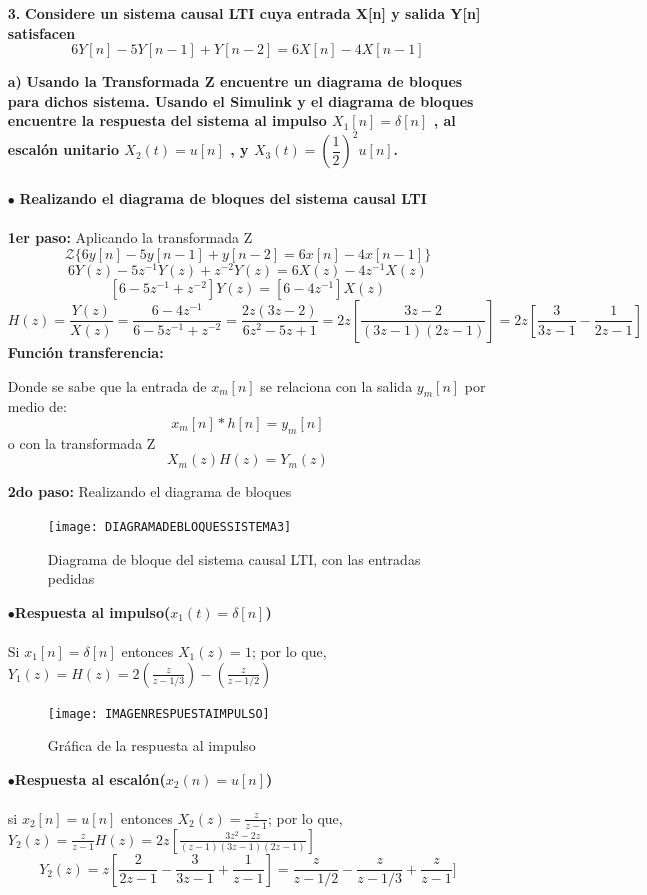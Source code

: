 \documentclass[11pt,a4paper]{article}
\begin{document}
{{\begin{enumerate}
	\item[\textbf{3.}]\textbf{Considere un sistema causal LTI cuya entrada X[n] y salida Y[n] satisfacen $$6Y[n]-5Y[n-1]+Y[n-2]=6X[n]-4X[n-1]$$}
	\item[\textbf{a)}]
	\textbf{Usando la Transformada Z encuentre un diagrama de bloques para dichos sistema. Usando el Simulink y el diagrama de bloques encuentre la respuesta del sistema al impulso $X_{1}[n]=\delta[n]$ , al escalón unitario $X_{2}(t)=u[n]$ , y $X_{3}(t)=(\dfrac{1}{2})^2 u[n]$.}\\\\
    $\bullet$ \textbf{Realizando el diagrama de bloques del sistema causal LTI}\\\\
    \textbf{1er paso:} Aplicando la transformada Z 
    $$\mathcal{Z}\{6y[n]-5y[n-1]+y[n-2]=6x[n]-4x[n-1]\}$$   
    $$6Y(z)-5z^{-1}Y(z)+z^{-2}Y(z)=6X(z)-4z^{-1}X(z)$$  
    $$[6-5z^{-1}+z^{-2}]Y(z)=[6-4z^{-1}]X(z)$$   
    $$H(z)=\frac{Y(z)}{X(z)}=\frac{6-4z^{-1}}{6-5z^{-1}+z^{-2}}=\frac{2z(3z-2)}{6z^2-5z+1}=2z[\frac{3z-2}{(3z-1)(2z-1)}]=2z[\frac{3}{3z-1}-\frac{1}{2z-1}]$$
    \textbf{Función transferencia:}
    \begin{center}
    \end{center}
    Donde se sabe que la entrada de $x_m[n]$ se relaciona con la salida $y_m[n]$ por medio de:  
    $$x_m[n]*h[n]=y_m[n]$$
    o con la transformada Z
    $$X_m(z)H(z)=Y_m(z)$$

	\textbf{2do paso: } Realizando el diagrama de bloques
	\begin{figure}[h]
	\centering
	\texttt{[image:  DIAGRAMADEBLOQUESSISTEMA3]} 
	\caption{Diagrama de bloque del sistema causal LTI, con las entradas pedidas}
\label{ DIAGRAMADEBLOQUESSISTEMA3}
\end{figure}
	\newpage

	$\bullet$\textbf{Respuesta al impulso($x_1(t)= \delta[n]$)}\\\\
	Si $x_1[n]=\delta[n]$ entonces $X_1(z)=1$; por lo que, $Y_1(z)=H(z)=2(\frac{z}{z-1/3})-(\frac{z}{z-1/2})$
	
	\begin{figure}[h]
	\centering
	\texttt{[image: IMAGENRESPUESTAIMPULSO]} 
	\caption{Gráfica de la respuesta al impulso}
\label{IMAGENRESPUESTAIMPULSO}
\end{figure}

	$\bullet$\textbf{Respuesta al escalón($x_2(n)= u[n]$)}\\\\
	 si $x_2[n]=u[n]$ entonces $X_2(z)=\frac{z}{z-1}$; por lo que, $Y_2(z)=\frac{z}{z-1}H(z)=2z[\frac{3z^2-2z}{(z-1)(3z-1)(2z-1)}]$        
     $$Y_2(z)=z[\frac{2}{2z-1}-\frac{3}{3z-1}+\frac{1}{z-1}]=\frac{z}{z-1/2}-\frac{z}{z-1/3}+\frac{z}{z-1}]$$


\end{enumerate}}}
\end{document}
